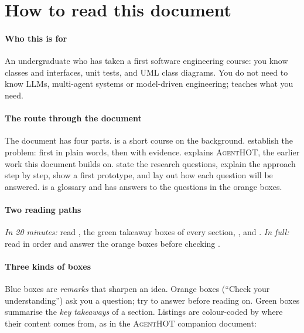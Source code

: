\documentclass[10pt,a4paper]{article}
\newcommand{\tool}{\textsc{AgentHOT}}
\newcounter{remark}
\begin{document}
\section{How to read this document}\label{sec:read}

\paragraph{Who this is for} An undergraduate who has taken a first
software engineering course: you know classes and interfaces, unit tests,
and UML class diagrams. You do not need to know LLMs, multi-agent systems
or model-driven engineering;  teaches what you need.

\paragraph{The route through the document} The document has four parts.
 is a short course on the background. 
establish the problem: first in plain words, then with evidence.
 explains \tool{}, the earlier work this document builds
on.  state the research
questions, explain the approach step by step, show a first prototype, and
lay out how each question will be answered.  is a
glossary and  has answers to the questions in the
orange boxes.

\paragraph{Two reading paths} \emph{In 20 minutes:} read ,
the green takeaway boxes of every section, , and
. \emph{In full:} read in order and answer the orange boxes
before checking .

\paragraph{Three kinds of boxes} Blue boxes are \emph{remarks} that sharpen
an idea. Orange boxes (``Check your understanding'') ask you a question;
try to answer before reading on. Green boxes summarise the \emph{key
takeaways} of a section.
Listings are colour-coded by where their content comes from, as in the
\tool{} companion document:
\end{document}
